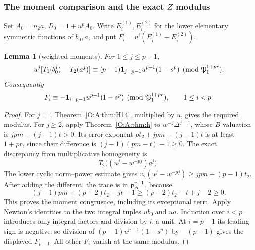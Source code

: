 \documentclass[11pt]{amsart}
\newtheorem{lemma}[theorem]{Lemma}
\theoremstyle{definition}
\theoremstyle{remark}
\begin{document}
\subsubsection*{\texorpdfstring{The moment comparison and the exact $Z$ modulus}{The moment comparison and the exact Z modulus}}
Set $A_0=n_2a$, $D_0=1+u^pA_0$. Write $E_i^{(1)},E_i^{(2)}$ for the
lower elementary symmetric functions of $b_0,a$, and put
$F_i=u^i(E_i^{(1)}-E_i^{(2)})$.

\begin{lemma}[weighted moments]\label{O:N:moments}
For $1\le j\le p-1$,
\[
 u^j[T_1(b_0^j)-T_2(a^j)]
 \equiv(p-1){\bf1}_{j=p-1}u^{p-1}(1-s^p)
             \pmod{\mathfrak P_1^{1+pr}}.
\]
Consequently
\[
 F_i\equiv-{\bf1}_{i=p-1}u^{p-1}(1-s^p)
             \pmod{\mathfrak P_1^{1+pr}},\qquad 1\le i<p.
\]
\end{lemma}
\begin{proof}
For $j=1$ Theorem~\ref{O:A:thm:H14}, multiplied by $u$, gives the
required modulus. For $j\ge2$, apply Theorem~\ref{O:A:thm:h} to
$w^{-j}\Delta^{j-1}$, whose $B$-valuation is $jpm-(j-1)t>0$.
Its error exponent $pt_2+jpm-(j-1)t$ is at least $1+pr$, since their
difference is $(j-1)(pm-t)-1\ge0$.
The exact discrepancy from multiplicative homogeneity is
\[
 T_2\bigl((u^j-w^{-pj})a^j\bigr).
\]
The lower cyclic norm--power estimate gives
$v_2(u^j-w^{-pj})\ge jpm+(p-1)t_2$.
After adding the different, the trace is in $\mathfrak p_A^{r+1}$, because
\[
 (j-1)pm+(p-2)t_2-jt-1
 \ge (p-2)t_2-t+j-2\ge0.
\]
This proves the moment congruence, including its exceptional term.
Apply Newton's identities to the two integral tuples $ub_0$ and $ua$.
Induction over $i<p$ introduces only integral factors and division by
$i$, a unit. At $i=p-1$ its leading sign is negative, so division of
$(p-1)u^{p-1}(1-s^p)$ by $-(p-1)$ gives the displayed $F_{p-1}$.
All other $F_i$ vanish at the same modulus.
\end{proof}
\end{document}
